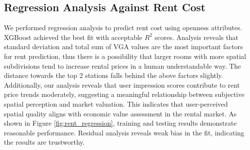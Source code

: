 \documentclass[11pt,a4paper]{article}
\begin{document}
\begin{multicols}{2}



\subsection{Regression Analysis Against Rent Cost}
We performed regression analysis to predict rent cost using openness attributes. XGBoost achieved 
the best fit with acceptable $R^2$ scores. Analysis reveals that standard deviation and total sum 
of VGA values are the most important factors for rent prediction, thus there is a possibility 
that larger rooms with more spatial subdivisions tend to increase rental prices in a human understandable way.
The distance towards the top 2 stations falls behind the above factors slightly.
Additionally, our analysis reveals that user impression scores contribute to rent price trends moderately, 
suggesting a meaningful relationship between subjective spatial perception and market valuation. 
This indicates that user-perceived spatial quality aligns with economic value assessment in the rental market.
As shown in Figure \ref{fig:rent_regression}, training and testing results demonstrate reasonable performance. 
Residual analysis reveals weak bias in the fit, indicating the results are trustworthy. 


\end{multicols}
\end{document}
